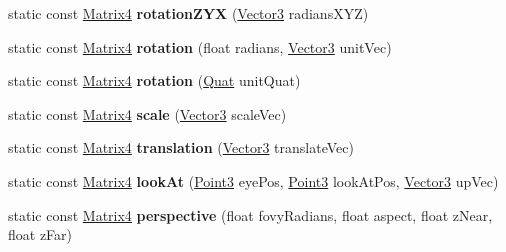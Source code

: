 \begin{DoxyCompactItemize}
\item 
\hypertarget{classVectormath_1_1Aos_1_1Matrix4_afc324cdb2fb0a66087a1eb96f71e7817}{static const \hyperlink{classVectormath_1_1Aos_1_1Matrix4}{Matrix4} {\bfseries rotation\-Z\-Y\-X} (\hyperlink{classVectormath_1_1Aos_1_1Vector3}{Vector3} radians\-X\-Y\-Z)}\label{classVectormath_1_1Aos_1_1Matrix4_afc324cdb2fb0a66087a1eb96f71e7817}

\item 
\hypertarget{classVectormath_1_1Aos_1_1Matrix4_abc9ffac4e283ba34e88f4e52c2876579}{static const \hyperlink{classVectormath_1_1Aos_1_1Matrix4}{Matrix4} {\bfseries rotation} (float radians, \hyperlink{classVectormath_1_1Aos_1_1Vector3}{Vector3} unit\-Vec)}\label{classVectormath_1_1Aos_1_1Matrix4_abc9ffac4e283ba34e88f4e52c2876579}

\item 
\hypertarget{classVectormath_1_1Aos_1_1Matrix4_aab52276c0b1f338703c76e8c34162fd0}{static const \hyperlink{classVectormath_1_1Aos_1_1Matrix4}{Matrix4} {\bfseries rotation} (\hyperlink{classVectormath_1_1Aos_1_1Quat}{Quat} unit\-Quat)}\label{classVectormath_1_1Aos_1_1Matrix4_aab52276c0b1f338703c76e8c34162fd0}

\item 
\hypertarget{classVectormath_1_1Aos_1_1Matrix4_ac285b6f5f23c3bc4702011b92da4594d}{static const \hyperlink{classVectormath_1_1Aos_1_1Matrix4}{Matrix4} {\bfseries scale} (\hyperlink{classVectormath_1_1Aos_1_1Vector3}{Vector3} scale\-Vec)}\label{classVectormath_1_1Aos_1_1Matrix4_ac285b6f5f23c3bc4702011b92da4594d}

\item 
\hypertarget{classVectormath_1_1Aos_1_1Matrix4_a1febbe17e2473f7abe73da01d344b45d}{static const \hyperlink{classVectormath_1_1Aos_1_1Matrix4}{Matrix4} {\bfseries translation} (\hyperlink{classVectormath_1_1Aos_1_1Vector3}{Vector3} translate\-Vec)}\label{classVectormath_1_1Aos_1_1Matrix4_a1febbe17e2473f7abe73da01d344b45d}

\item 
\hypertarget{classVectormath_1_1Aos_1_1Matrix4_a3284af3048150492c08b4e3cde100770}{static const \hyperlink{classVectormath_1_1Aos_1_1Matrix4}{Matrix4} {\bfseries look\-At} (\hyperlink{classVectormath_1_1Aos_1_1Point3}{Point3} eye\-Pos, \hyperlink{classVectormath_1_1Aos_1_1Point3}{Point3} look\-At\-Pos, \hyperlink{classVectormath_1_1Aos_1_1Vector3}{Vector3} up\-Vec)}\label{classVectormath_1_1Aos_1_1Matrix4_a3284af3048150492c08b4e3cde100770}

\item 
\hypertarget{classVectormath_1_1Aos_1_1Matrix4_a5c56753075ff7fc280c7534f0f7f3310}{static const \hyperlink{classVectormath_1_1Aos_1_1Matrix4}{Matrix4} {\bfseries perspective} (float fovy\-Radians, float aspect, float z\-Near, float z\-Far)}\label{classVectormath_1_1Aos_1_1Matrix4_a5c56753075ff7fc280c7534f0f7f3310}


\end{DoxyCompactItemize}
